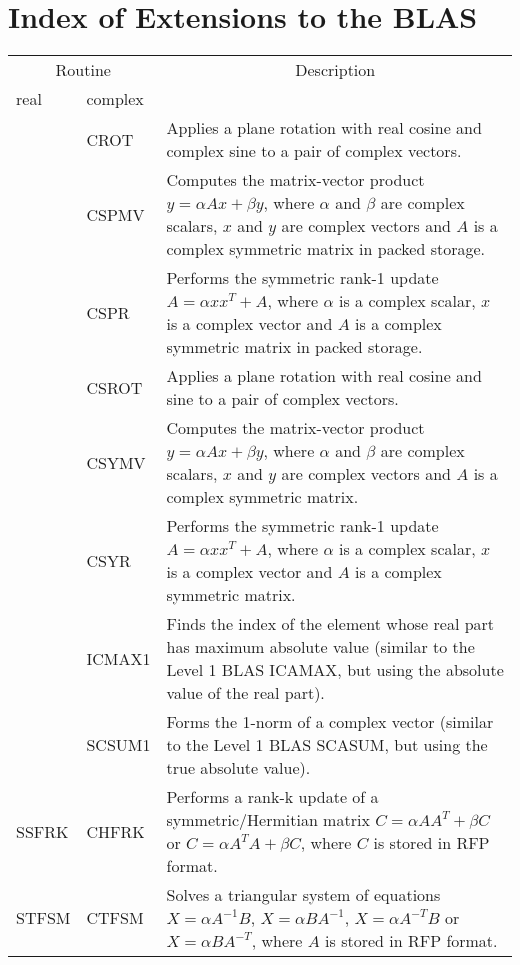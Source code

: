 \newpage

\section{Index of Extensions to the BLAS}\label{secindexauxilblasext}

\begin{center}
\begin{tabular}{| l   l | p{4.5in}    |}
\hline \multicolumn{2}{|c|}{Routine}&\multicolumn{1}{c|}{Description} \\ 
\cline{1-2} real&complex&\\
\hline \hline
& CROT&
Applies a plane rotation with real cosine and complex sine
to a pair of complex vectors.\\
& CSPMV &
Computes the matrix-vector product $y = \alpha Ax + \beta y$,
where $\alpha$ and $\beta$ are complex scalars, 
$x$ and $y$ are complex vectors and
$A$ is a complex symmetric matrix in packed storage.\\
& CSPR &
Performs the symmetric rank-1 update $A = \alpha x x^T  + A$,
where $\alpha$ is a complex scalar, 
$x$ is a complex vector and 
$A$ is a complex symmetric matrix in packed storage.\\
& CSROT &
Applies a plane rotation with real cosine and sine
to a pair of complex vectors.\\
& CSYMV &
Computes the matrix-vector product $y = \alpha Ax + \beta y$,
where $\alpha$ and $\beta$ are complex scalars, 
$x$ and $y$ are complex vectors and
$A$ is a complex symmetric matrix.\\
& CSYR &
Performs the symmetric rank-1 update $A = \alpha x x^T  + A$,
where $\alpha$ is a complex scalar, 
$x$ is a complex vector and 
$A$ is a complex symmetric matrix.\\
& ICMAX1 &
Finds the index of the element whose real part has maximum absolute value 
(similar to the Level 1 BLAS ICAMAX,
but using the absolute value of the real part).\\
& SCSUM1 &
Forms the 1-norm of a complex vector 
(similar to the Level 1 BLAS SCASUM,
but using the true absolute value).\\
SSFRK&CHFRK&
Performs a rank-{k} update of a symmetric/Hermitian matrix 
$C= \alpha AA^{T}+\beta C$ or $C= \alpha A^{T}A+\beta C$,
where $C$ is stored in RFP format.\\
STFSM&CTFSM&
Solves a triangular system of equations $X=\alpha A^{-1} B$, $X=\alpha B A^{-1}$, 
$X=\alpha A^{-T} B$ or $X=\alpha B A^{-T}$, 
where $A$ is stored in RFP format.\\
\hline
\end{tabular}
\end{center}
